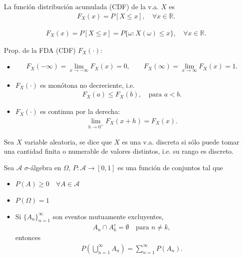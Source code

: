 \begin{Def} La funci\'on distribuci\'on acumulada (CDF)
de la v.a. $X$ es
\begin{eqnarray*}
F_X(x)=P[X\le x], \quad \forall x\in\mathbb{R}.
\end{eqnarray*}

\begin{eqnarray*}
F_X(x)=P[X\le x]
= P\{\omega: X(\omega)\le x\}, \quad \forall x\in\mathbb{R}.
\end{eqnarray*}
\end{Def}

\begin{Propty}
Prop. de la FDA (CDF) $F_X(\cdot)$:
\begin{itemize}
\item[a) ]
\begin{eqnarray*}
F_X(-\infty)=\lim_{x\to -\infty}F_X(x)=0,\qquad F_X(\infty)=\lim_{x\to \infty}F_X(x)=1.
\end{eqnarray*}

\item[b) ] $F_X(\cdot)$ es mon\'otona no decreciente, i.e.
\begin{eqnarray*}
F_X(a)\le F_X(b), \quad \text{para } a<b.
\end{eqnarray*}

\item[c) ] $F_X(\cdot)$ es continua por la derecha:
\begin{eqnarray*}
\lim_{h\to 0^+}F_X(x+h)=F_X(x).
\end{eqnarray*}
\end{itemize}
\end{Propty}

\begin{Def}  Sea $X$ variable aleatoria, se dice que $X$ es una v.a. discreta si s\'olo puede tomar una cantidad finita o numerable de valores distintos, i.e. su rango es discreto.
\end{Def}

\begin{Def} Sea $\mathcal{A}$ $\sigma$-\'algebra en $\Omega$, $P:\mathcal{A}\to[0,1]$ es una funci\'on de conjuntos tal que
\begin{itemize}
\item[1) ]$P(A)\ge 0 \quad \forall A\in\mathcal{A}$

\item[2) ]$P(\Omega)=1$

\item[3) ]Si $\{A_n\}_{n=1}^\infty$ son eventos mutuamente excluyentes,
\begin{eqnarray*}
A_n \cap A_{k}^{c}=\emptyset \quad \textrm{para } n\neq k,
\end{eqnarray*}
entonces
\begin{eqnarray*}
P\left(\bigcup_{n=1}^\infty A_n\right)= \sum_{n=1}^\infty P(A_n).
\end{eqnarray*}
\end{itemize}
\end{Def}

